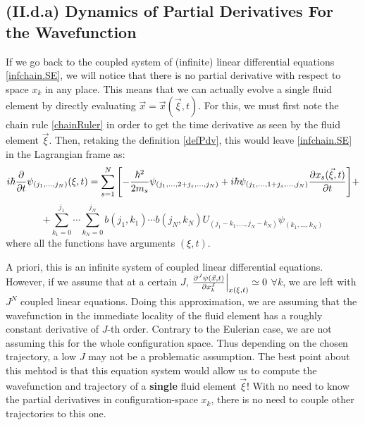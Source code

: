 \documentclass[11pt, a4paper]{article} %
\begin{document}
\subsection*{(II.d.a) Dynamics of Partial Derivatives For the Wavefunction\vspace{-0.1cm}}

If we go back to the coupled system of (infinite) linear differential equations \eqref{infchain.SE}, we will notice that there is no partial derivative with respect to space $x_k$ in any place. This means that we can actually evolve a single fluid element by directly evaluating $\vec{x}=\vec{x}(\vec{\xi},t)$. For this, we must first note the chain rule \eqref{chainRuler} in order to get the time derivative as seen by the fluid element $\vec{\xi}$.
Then, retaking the definition \eqref{defPdv}, this would leave \eqref{infchain.SE} in the Lagrangian frame as:\vspace{-0.1cm}
\begin{equation}\label{infchain.SE.L}
i\hbar \pdv{}{t}\psi_{(j_1,...,j_N)}(\xi,t)=\sum_{s=1}^N\qty[-\frac{\hbar^2}{2m_s}\psi_{(j_1,...,2+j_s,...,j_N)}+i\hbar \psi_{(j_1,...,1+j_s,...,j_N)} \pdv{x_s(\vec{\xi},t)}{t}]+\vspace{-0.1cm}
\end{equation}
$$
+\sum_{k_1=0}^{j_1}\cdots\sum_{k_N=0}^{j_N} b(j_1,k_1)\cdots b(j_N,k_N)U_{(j_1-k_1,...,j_N-k_N)}\psi_{(k_1,...,k_N)}
$$
where all the functions have arguments $(\xi,t)$.

A priori, this is an infinite system of coupled linear differential equations. However, if we assume that at a certain $J$, $\pdv[J]{\psi(\vec{x},t)}{x_k}\Big\rvert_{x(\xi,t)}\simeq 0$  $\forall k$, we are left with $J^N$ coupled linear equations. Doing this approximation, we are assuming that the wavefunction in the immediate locality of the fluid element has a roughly constant derivative of $J$-th order. Contrary to the Eulerian case, we are not assuming this for the whole configuration space. Thus depending on the chosen trajectory, a low $J$ may not be a problematic assumption. The best point about this mehtod is that this equation system would allow us to compute the wavefunction and trajectory of a {\bf single} fluid element $\vec{\xi}$! With no need to know the partial derivatives in configuration-space $x_k$, there is no need to couple other trajectories to this one.
\end{document}
